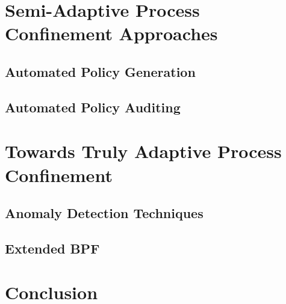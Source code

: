 \documentclass[dvipsnames, 12pt]{article}
\begin{document}

\section{Semi-Adaptive Process Confinement Approaches}
\label{sec:semi-adaptive}

\subsection{Automated Policy Generation}

\subsection{Automated Policy Auditing}

\section{Towards Truly Adaptive Process Confinement}
\label{sec:towards}

\subsection{Anomaly Detection Techniques}

\subsection{Extended BPF}


\section{Conclusion}
\label{sec:conclusion}


\nocite{*} %
\clearpage
\printbibliography
\end{document}
